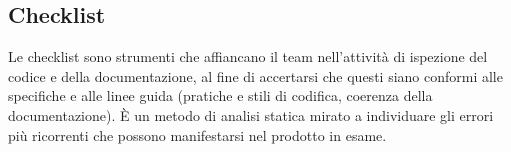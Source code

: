 \subsection{Checklist}

\par Le checklist sono strumenti che affiancano il team nell'attività di ispezione del codice e della documentazione, al fine di accertarsi che questi siano conformi alle specifiche e alle linee guida (pratiche e stili di codifica, coerenza della documentazione). È un metodo di analisi statica mirato a individuare gli errori più ricorrenti che possono manifestarsi nel prodotto in esame.

\clearpage



